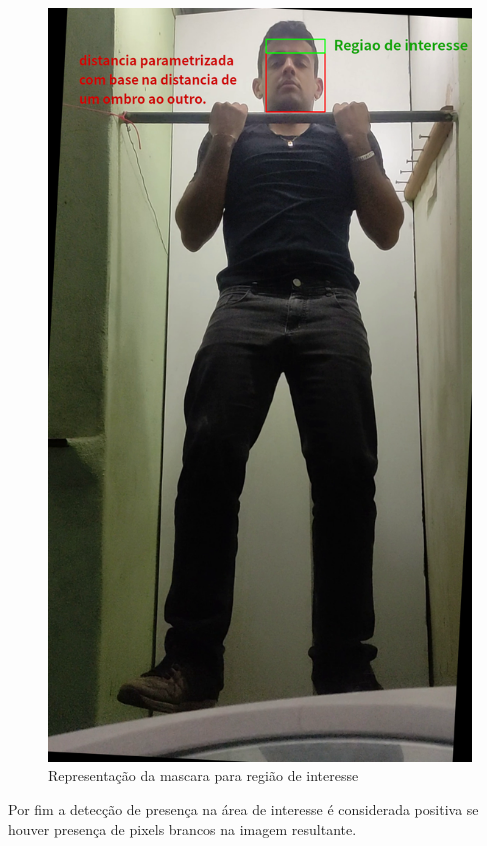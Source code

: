 \begin{figure}[!htbp]
\begin{minipage}{\sizeImg\textwidth}
            \includegraphics[width=\textwidth]{figuras/ultrapassar_barra/133_image_with_legend.png}
        \end{minipage}
    \caption{Representação da mascara para região de interesse }
    \label{fig:Mascara_ultrapassar_barra}
\end{figure}
\newpage

Por fim a detecção de presença na área de interesse é considerada positiva se houver presença de pixels brancos na imagem resultante.

